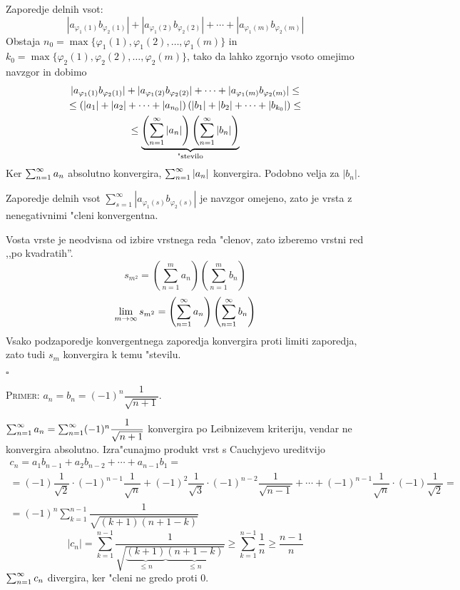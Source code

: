 Zaporedje delnih vsot:
\begin{equation*}
|a_{\varphi_1(1)} b_{\varphi_2(1)}| + |a_{\varphi_1(2)} b_{\varphi_2(2)}| + \cdots + |a_{\varphi_1(m)} b_{\varphi_2(m)}|
\end{equation*}
Obstaja $n_0 = \max \{\varphi_1(1), \varphi_1(2), \ldots, \varphi_1(m)\}$ in $k_0 = \max \{\varphi_2(1), \varphi_2(2), \dots, \varphi_2(m)\}$, tako da lahko zgornjo vsoto omejimo navzgor in dobimo
\begin{multline*}
|a_{\varphi_1(1)} b_{\varphi_2(1)}| + |a_{\varphi_1(2)} b_{\varphi_2(2)}| + \cdots + |a_{\varphi_1(m)} b_{\varphi_2(m)}| \leq  \\
\leq \left(|a_1| + |a_2| + \cdots + |a_{n_0}|\right)\left(|b_1| + |b_2| + \cdots + |b_{k_0}|\right) \leq \\ 
\leq \underbrace{\left(\sum_{n = 1}^{\infty}|a_n|\right) \left(\sum_{n = 1}^{\infty}|b_n|\right)}_{\text{"stevilo}}
\end{multline*}
Ker $\sum_{n = 1}^{\infty}a_n$ absolutno konvergira, $\sum_{n = 1}^{\infty}|a_n|$ konvergira. Podobno velja za $|b_n|$.

Zaporedje delnih vsot $\sum_{s=1}^{\infty}|a_{\varphi_1(s)} b_{\varphi_2(s)}|$ je navzgor omejeno, zato je vrsta z nenegativnimi "cleni konvergentna.

Vosta vrste je neodvisna od izbire vrstnega reda "clenov, zato izberemo vrstni red ,,po kvadratih''.
\begin{equation*}
s_{m^2} = \left(\sum_{n=1}^{m}a_n\right) \left(\sum_{n=1}^{m}b_n\right)
\end{equation*}
\begin{equation*}
\lim_{m\to \infty} s_{m^2} = \left(\sum_{n = 1}^{\infty}a_n\right) \left(\sum_{n = 1}^{\infty}b_n\right)
\end{equation*}
Vsako podzaporedje konvergentnega zaporedja konvergira proti limiti zaporedja, zato tudi $s_m$ konvergira k temu "stevilu.

\hfill $\square$

\textsc{Primer:} $a_n = b_n = (-1)^n \dfrac{1}{\sqrt{n+1}}$.

$\sum_{n = 1}^{\infty}a_n = \sum_{n = 1}^{\infty}(-1)^n \dfrac{1}{\sqrt{n+1}}$ konvergira po Leibnizevem kriteriju, vendar ne konvergira absolutno. Izra"cunajmo produkt vrst s Cauchyjevo ureditvijo
\begin{multline*}
c_n = a_1 b_{n-1} + a_2 b_{n-2} + \cdots + a_{n-1} b_1 = \\
= (-1) \dfrac{1}{\sqrt{2}} \cdot (-1)^{n-1} \dfrac{1}{\sqrt{n}} + (-1)^2 \dfrac{1}{\sqrt{3}} \cdot (-1)^{n-2} \dfrac{1}{\sqrt{n-1}} + \cdots + (-1)^{n-1}\dfrac{1}{\sqrt{n}}\cdot (-1)\dfrac{1}{\sqrt 2} = \\
=(-1)^n \sum_{k=1}^{n-1} \dfrac{1}{\sqrt{(k+1)(n+1-k)}}
\end{multline*}
\begin{equation*}
|c_n| = \sum_{k=1}^{n-1} \dfrac{1}{\sqrt{\underbrace{(k+1)}_{\leq n} \underbrace{(n+1-k)}_{\leq n}}} \geq \sum_{k=1}^{n-1}\dfrac{1}{n} \geq \dfrac{n-1}{n}
\end{equation*}
$\sum_{n = 1}^{\infty}c_n$ divergira, ker "cleni ne gredo proti 0.

